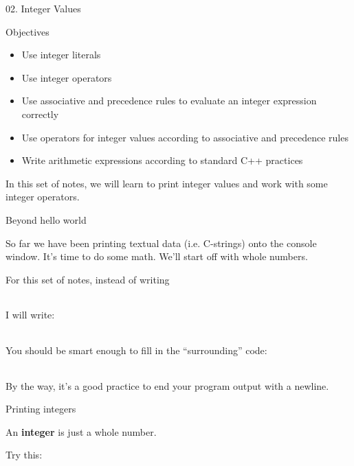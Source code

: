 \documentclass[
]{article}
\author{}
\date{}
\providecommand{\tightlist}{%
  \setlength{\itemsep}{0pt}\setlength{\parskip}{0pt}}
\begin{document}
02. Integer Values

Objectives

\begin{itemize}
\tightlist
\item
  Use integer literals
\end{itemize}

\begin{itemize}
\tightlist
\item
  Use integer operators
\item
  Use associative and precedence rules to evaluate an integer expression
  correctly
\item
  Use operators for integer values according to associative and
  precedence rules
\item
  Write arithmetic expressions according to standard C++ practices
\end{itemize}

In this set of notes, we will learn to print integer values and work
with some integer operators.

Beyond hello world

So far we have been printing textual data (i.e. C-strings) onto the
console window. It's time to do some math. We'll start off with whole
numbers.

For this set of notes, instead of writing

\begin{longtable}[]{@{}@{}}
\toprule
\endhead
\bottomrule
\end{longtable}

I will write:

\begin{longtable}[]{@{}@{}}
\toprule
\endhead
\bottomrule
\end{longtable}

You should be smart enough to fill in the ``surrounding'' code:

\begin{longtable}[]{@{}@{}}
\toprule
\endhead
\bottomrule
\end{longtable}

By the way, it's a good practice to end your program output with a
newline.

Printing integers

An \textbf{integer} is just a whole number.

Try this:

\begin{longtable}[]{@{}@{}}
\toprule
\endhead
\bottomrule
\end{longtable}
\end{document}
